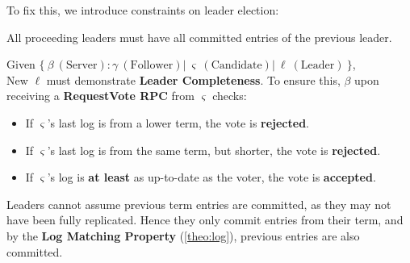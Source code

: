 \noindent
To fix this, we introduce constraints on leader election:

\begin{Def}

    All proceeding leaders must have all committed entries of the previous leader.
\end{Def}

\begin{Def}

    Given $\{\ \beta\ (\text{Server}): \gamma\ (\text{Follower})  |\ \varsigma\ (\text{Candidate}) |\ \ell\ (\text{Leader})\ \}$,\\
    New $\ell$ must demonstrate \textbf{Leader Completeness}. To ensure this, $\beta$ upon receiving a \textbf{RequestVote RPC} from $\varsigma$ checks:
    \begin{itemize}
        \item If $\varsigma$'s last log is from a lower term, the vote is \textbf{rejected}.
        \item If $\varsigma$'s last log is from the same term, but shorter, the vote is \textbf{rejected}.
        \item If $\varsigma$'s log is \textbf{at least} as up-to-date as the voter, the vote is \textbf{accepted}.
    \end{itemize}
\end{Def}

\begin{theo}

    Leaders cannot assume previous term entries are committed, as they may not have been fully replicated.
    Hence they only commit entries from their term, and by the \textbf{Log Matching Property} (\ref{theo:log}), previous entries are also committed.
\end{theo}

